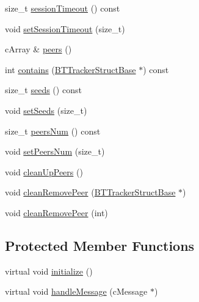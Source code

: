 \begin{DoxyCompactItemize}
\item 
size\+\_\+t \hyperlink{classBTTrackerBase_aa25cbbeee60a86a81bd862d74bb098b5}{session\+Timeout} () const 
\item 
void \hyperlink{classBTTrackerBase_a978f8dc10a807b37eac2615f8a6b6a36}{set\+Session\+Timeout} (size\+\_\+t)
\item 
c\+Array \& \hyperlink{classBTTrackerBase_ab5dd962e8b31d9da764cac4339f88bb6}{peers} ()
\item 
int \hyperlink{classBTTrackerBase_aee3f129e66a6690df7e6e3279599f171}{contains} (\hyperlink{classBTTrackerStructBase}{B\+T\+Tracker\+Struct\+Base} $\ast$) const 
\item 
size\+\_\+t \hyperlink{classBTTrackerBase_ae5c78b500fcbcf7a4881d3f584a3027d}{seeds} () const 
\item 
void \hyperlink{classBTTrackerBase_af9b9f0ed01cf67b1e464402f6f884f42}{set\+Seeds} (size\+\_\+t)
\item 
size\+\_\+t \hyperlink{classBTTrackerBase_aabbe120067d9081485e90a4e71e675b7}{peers\+Num} () const 
\item 
void \hyperlink{classBTTrackerBase_aee0793e4cabbd2f61104587c4aff5a31}{set\+Peers\+Num} (size\+\_\+t)
\item 
void \hyperlink{classBTTrackerBase_ad1b9190f3117918ce2404f6fae5af26a}{clean\+Up\+Peers} ()
\item 
void \hyperlink{classBTTrackerBase_ae2ccfb420d08172f2ed5b544c9067fd5}{clean\+Remove\+Peer} (\hyperlink{classBTTrackerStructBase}{B\+T\+Tracker\+Struct\+Base} $\ast$)
\item 
void \hyperlink{classBTTrackerBase_ab1600e226ac13ecfbf9993e50cd8f1b2}{clean\+Remove\+Peer} (int)
\end{DoxyCompactItemize}
\subsection*{Protected Member Functions}
\begin{DoxyCompactItemize}
\item 
virtual void \hyperlink{classBTTrackerBase_a0bc53255febc095ae8ac4b5efc53d193}{initialize} ()
\item 
virtual void \hyperlink{classBTTrackerBase_a88120a6f9fb7e0ddbc3b4c794b842572}{handle\+Message} (c\+Message $\ast$)
\end{DoxyCompactItemize}
